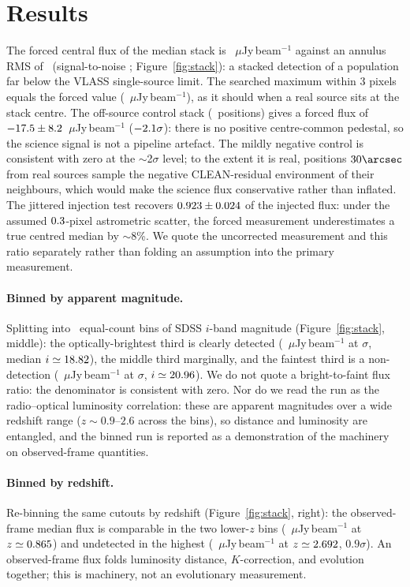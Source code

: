 \documentclass[twocolumn]{aastex631}
\begin{document}
\section{Results}
The forced central flux of the median stack is \stFlux~$\mu$Jy\,beam$^{-1}$ against an annulus RMS
of \stRms\ (signal-to-noise \stSNR; Figure~\ref{fig:stack}): a stacked detection of a population
far below the VLASS single-source limit. The searched maximum within 3 pixels equals the forced
value (\stPeakSearched~$\mu$Jy\,beam$^{-1}$), as it should when a real source sits at the stack
centre. The off-source control stack (\stCtlN\ positions) gives a forced flux of
$-17.5\pm8.2$~$\mu$Jy\,beam$^{-1}$ ($-2.1\sigma$): there is no positive
centre-common pedestal, so the science signal is not a pipeline artefact. The mildly negative
control is consistent with zero at the $\sim$2$\sigma$ level; to the extent it is real, positions
$30\arcsec$ from real sources sample the negative CLEAN-residual environment of their neighbours,
which would make the science flux conservative rather than inflated. The jittered injection test
recovers $0.923\pm0.024$ of the injected flux: under the assumed
$0.3$-pixel astrometric scatter, the forced measurement underestimates a true centred
median by $\sim$8\%. We quote the uncorrected measurement and this ratio separately rather than
folding an assumption into the primary measurement.

\paragraph{Binned by apparent magnitude.} Splitting into \stNbins\ equal-count bins of SDSS
$i$-band magnitude (Figure~\ref{fig:stack}, middle): the optically-brightest third is clearly
detected (\stBrightFlux~$\mu$Jy\,beam$^{-1}$ at \stBrightSNR$\sigma$, median $i\simeq18.82$),
the middle third marginally, and the faintest third is a non-detection
(\stFaintFlux~$\mu$Jy\,beam$^{-1}$ at \stFaintSNR$\sigma$, $i\simeq20.96$). We do not quote a
bright-to-faint flux ratio: the denominator is consistent with zero. Nor do we read the run as the
radio--optical luminosity correlation: these are apparent magnitudes over a wide redshift
range ($z\sim0.9$--$2.6$ across the bins), so distance and luminosity are entangled, and the binned
run is reported as a demonstration of the machinery on observed-frame quantities.

\paragraph{Binned by redshift.} Re-binning the same cutouts by redshift (Figure~\ref{fig:stack},
right): the observed-frame median flux is comparable in the two lower-$z$ bins
(\stLowzFlux~$\mu$Jy\,beam$^{-1}$ at $z\simeq0.865$) and undetected in the highest
(\stHighzFlux~$\mu$Jy\,beam$^{-1}$ at $z\simeq2.692$, $0.9\sigma$). An observed-frame flux
folds luminosity distance, $K$-correction, and evolution together; this is machinery, not an
evolutionary measurement.
\end{document}
